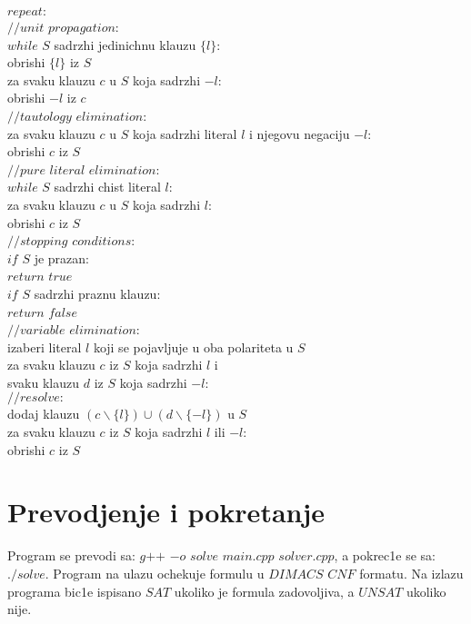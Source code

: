 \documentclass[a4paper,titlepage,12pt]{article}
\begin{document}
\noindent $repeat:$\\
\indent $//unit$ $propagation:$\\
\indent $while$ $S$ sadrzhi jedinichnu klauzu $\{l\}$:\\
\indent \indent obrishi $\{l\}$ iz $S$\\
\indent \indent za svaku klauzu $c$ u $S$ koja sadrzhi $-l$:\\
\indent \indent \indent obrishi $-l$ iz $c$\\
\indent $//tautology$ $elimination:$\\
\indent za svaku klauzu $c$ u $S$ koja sadrzhi literal $l$ i njegovu negaciju $-l$:\\
\indent \indent obrishi $c$ iz $S$\\
\indent $//pure$ $literal$ $elimination:$\\
\indent $while$ $S$ sadrzhi chist literal $l$:\\
\indent \indent za svaku klauzu $c$ u $S$ koja sadrzhi $l$:\\
\indent \indent \indent obrishi $c$ iz $S$\\
\indent $//stopping$ $conditions:$\\
\indent $if$ $S$ je prazan:\\
\indent \indent $return$ $true$\\
\indent $if$ $S$ sadrzhi praznu klauzu:\\
\indent \indent $return$ $false$\\
\indent $//variable$ $elimination:$\\
\indent izaberi literal $l$ koji se pojavljuje u oba polariteta u $S$\\
\indent \indent za svaku klauzu $c$ iz $S$ koja sadrzhi $l$ i\\
\indent \indent svaku klauzu $d$ iz $S$ koja sadrzhi $-l$:\\
\indent \indent \indent $//resolve:$\\
\indent \indent \indent dodaj klauzu $(c \backslash \{l\}) \cup (d \backslash \{-l\})$ u $S$\\
\indent \indent za svaku klauzu $c$ iz $S$ koja sadrzhi $l$ ili $-l$:\\
\indent \indent \indent obrishi $c$ iz $S$

\section{Prevodjenje i pokretanje}

Program se prevodi sa: $g$$+$$+$ $-o$ $solve$ $main.cpp$ $solver.cpp$, a pokrec1e se sa: $./solve$. Program na ulazu ochekuje formulu u $DIMACS$ $CNF$ formatu. Na izlazu programa bic1e ispisano $SAT$ ukoliko je formula zadovoljiva, a $UNSAT$ ukoliko nije.
\end{document}
